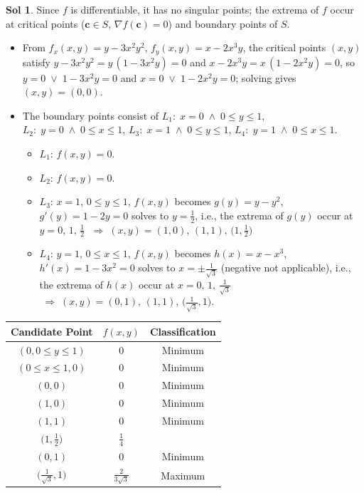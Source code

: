 \documentclass[12pt]{extarticle}
\newcommand{\ds}{\displaystyle}
\newcommand{\ie}{\;\Longrightarrow\;}
\newcommand{\orr}{\;\vee\;}
\newcommand{\andd}{\;\wedge\;}
\theoremstyle{definition}
\newtheorem*{sol}{Sol}
\newcommand{\vc}{\mathbf{c}}
\begin{document}
\begin{sol}
  Since $f$ is differentiable, it has no singular points; the extrema of $f$ occur at critical points ($\vc\in S,\,\nabla f(\vc) = 0$) and boundary points of $S$. 
  \begin{itemize}\setlength\itemsep{0em}
    \item From $\ds f_x(x, y) = y - 3x^2y^2$, $\ds f_y(x, y) = x - 2x^3y$, the critical points $(x, y)$ satisfy $\ds y - 3x^2y^2 = y\,(1 - 3x^2y) = 0$ and $\ds x - 2x^3y = x\,(1 - 2x^2y)= 0$, so $y = 0\orr 1 - 3x^2y = 0$ and $x = 0\orr 1 - 2x^2y = 0$; solving gives $(x, y) = (0, 0)$. 
    \item The boundary points consist of $L_1:\;x = 0\andd 0\leqslant y\leqslant 1$, $L_2:\;y = 0\andd 0\leqslant x\leqslant 1$, $L_3:\;x = 1\andd 0\leqslant y\leqslant 1$, $L_4:\;y = 1\andd 0\leqslant x\leqslant 1$. 
      \begin{itemize}\setlength\itemsep{0em}
        \item $L_1$: $f(x, y) = 0$. 
        \item $L_2$: $f(x, y) = 0$. 
        \item $L_3$: $x = 1$, $0\leqslant y\leqslant1$, $f(x, y)$ becomes $g(y) = y - y^2$, $g'(y) = 1 - 2y = 0$ solves to $y = \frac{1}{2}$, i.e., the extrema of $g(y)$ occur at $y = 0,\,1,\,\frac{1}{2}$ $\ie (x, y) = (1, 0),\,(1, 1),\,\big(1, \frac{1}{2}\big)$ 
        \item $L_4$: $y = 1$, $0\leqslant x\leqslant1$, $f(x, y)$ becomes $h(x) = x - x^3$, $h'(x) = 1 - 3x^2 = 0$ solves to $x = \pm\frac{1}{\sqrt{3}}$ (negative not applicable), i.e., the extrema of $h(x)$ occur at $x = 0,\,1,\,\frac{1}{\sqrt{3}}$ $\ie (x, y) = (0, 1),\,(1, 1),\,\big(\frac{1}{\sqrt{3}}, 1\big)$. 
      \end{itemize}
  \end{itemize}
  \begin{center}
  \renewcommand{\arraystretch}{1.3}
  \begin{tabular}{ccc}
    \toprule
    Candidate Point & $f(x, y)$ & Classification \\    
    \midrule
    $(0, 0\leqslant y\leqslant 1)$ & $0$ & Minimum \\
    $(0\leqslant x\leqslant 1, 0)$ & $0$ & Minimum \\
    $(0, 0)$  & $0$ &  Minimum \\ 
    $(1, 0)$  & $0$ &  Minimum \\ 
    $(1, 1)$  & $0$ &  Minimum \\ 
    $\big(1, \frac{1}{2}\big)$  & $\frac{1}{4}$ &  \\ 
    $(0, 1)$  & $0$ &  Minimum \\ 
    $\big(\frac{1}{\sqrt{3}}, 1\big)$  & $\frac{2}{3\sqrt{3}}$ & Maximum \\ 
    \bottomrule
  \end{tabular}
  \renewcommand{\arraystretch}{1.0}
  \end{center}
\end{sol}
\end{document}
